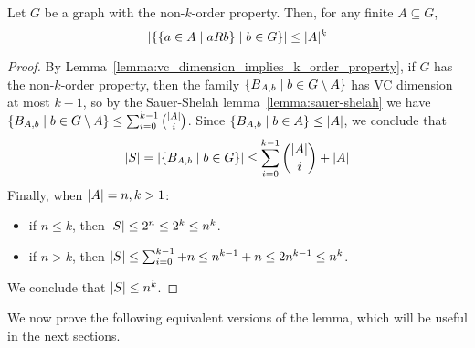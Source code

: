     \begin{lemma}[Claim 2.6] \label{claim_2.6}
        Let $G$ be a graph with the non-$k$-order property.
        Then, for any finite $A \subseteq G$,
        \[
            \left| \left\{ \left\{ a \in A \mid a R b \right\} \mid b \in G \right\} \right| \leq |A|^k
        \]
        \begin{proof}
            By Lemma~\ref{lemma:vc_dimension_implies_k_order_property}, if $G$ has the non-$k$-order property,
            then the family $\left\{ B_{A,b} \mid b \in G \setminus A \right\}$ has VC dimension at most $k-1$,
            so by the Sauer-Shelah lemma~\ref{lemma:sauer-shelah} we have
            $\left\{ B_{A,b} \mid b \in G \setminus A \right\} \leq \sum_{i=0}^{k-1} \binom{|A|}{i}$.
            Since $\left\{ B_{A,b} \mid b \in A \right\} \leq \left| A \right|$, we conclude that
            \[
                \left| S \right| = \left| \left\{ B_{A,b} \mid b \in G \right\} \right| \leq \sum_{i=0}^{k-1} \binom{|A|}{i} + |A|
            \]
            Finally, when $\left| A \right| = n,k > 1$: 
            \begin{itemize}
                \item if $n \leq k$, then $\left| S \right| \leq 2^n \leq 2^k \leq n^k$.
                \item if $n > k$, then $\left| S \right| \leq \sum_{i=0}^{k-1} + n \leq n^{k-1} + n \leq 2n^{k-1} \leq n^k$.
            \end{itemize}
            We conclude that $\left| S \right| \leq n^k$.
        \end{proof}
    \end{lemma}

    We now prove the following equivalent versions of the lemma, which will be useful in the next sections.

